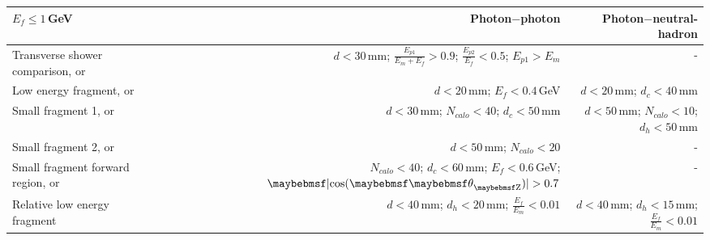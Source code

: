 


\begin{table}[htbp]
\centering

\smallskip

\begin{tabular}{l  r  r }
\hline
\hline
$E_f\leqslant1$\,GeV &  Photon$-$photon & Photon$-$neutral-hadron \\
\hline
\multicolumn{1}{L{0.3\textwidth}}{Transverse shower comparison, or} & \multicolumn{1}{R{0.3\textwidth}}{$d < 30 $\,mm; $\frac{E_{p1}}{E_m + E_f} > 0.9 $; $\frac{E_{p2}}{E_f} < 0.5 $; $E_{p1} > E_m$}  & \multicolumn{1}{R{0.3\textwidth}}{-} \\
\multicolumn{1}{L{0.3\textwidth}}{Low energy fragment, or} & \multicolumn{1}{R{0.3\textwidth}}{$d < 20 $\,mm; $E_f < 0.4 $\,GeV}  & \multicolumn{1}{R{0.3\textwidth}}{$d < 20 $\,mm; $d_c < 40 $\,mm} \\
\multicolumn{1}{L{0.3\textwidth}}{Small fragment 1, or} & \multicolumn{1}{R{0.3\textwidth}}{$d < 30 $\,mm; $N_{calo} < 40 $; $d_c < 50 $\,mm}  & \multicolumn{1}{R{0.3\textwidth}}{$d < 50 $\,mm; $N_{calo} < 10 $; $d_h < 50$\,mm} \\
\multicolumn{1}{L{0.3\textwidth}}{Small fragment 2, or} & \multicolumn{1}{R{0.3\textwidth}}{$d < 50 $\,mm; $N_{calo} < 20 $}  & \multicolumn{1}{R{0.3\textwidth}}{-} \\
\multicolumn{1}{L{0.3\textwidth}}{Small fragment forward region, or} & \multicolumn{1}{R{0.3\textwidth}}{$N_{calo} < 40$; $d_c < 60$\,mm; $E_f < 0.6$\,GeV; $\absCosTheta > 0.7$}  & \multicolumn{1}{R{0.3\textwidth}}{-} \\
\multicolumn{1}{L{0.3\textwidth}}{Relative low energy fragment} & \multicolumn{1}{R{0.3\textwidth}}{$d < 40$\,mm; $d_h < 20$\,mm; $\frac{E_{f}}{E_m} < 0.01$}  & \multicolumn{1}{R{0.3\textwidth}}{$d < 40$\,mm; $d_h < 15$\,mm; $\frac{E_{f}}{E_m} < 0.01$} \\

\end{tabular}
\end{table}
